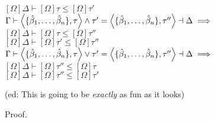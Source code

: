 \documentclass{article}
\begin{document}
\begin{tabbing}
\> $[\Omega]\Delta \vdash [\Omega]\tau \leq [\Omega]\tau'$\\
$\Gamma \vdash \left<\{\hat{\beta}_1,\ldots,\hat{\beta}_n\},\tau\right> \wedge \tau' = \left<\{\hat{\beta}_1,\ldots,\hat{\beta}_n\},\tau''\right> \dashv \Delta \implies$\\
\> $[\Omega]\Delta \vdash [\Omega]\tau \leq [\Omega]\tau''$\\
\> $[\Omega]\Delta \vdash [\Omega]\tau' \leq [\Omega]\tau''$\\
$\Gamma \vdash \left<\{\hat{\beta}_1,\ldots,\hat{\beta}_n\},\tau\right> \vee \tau' = \left<\{\hat{\beta}_1,\ldots,\hat{\beta}_n\},\tau''\right> \dashv \Delta \implies$\\
\> $[\Omega]\Delta \vdash [\Omega]\tau'' \leq [\Omega]\tau$\\
\> $[\Omega]\Delta \vdash [\Omega]\tau'' \leq [\Omega]\tau'$\\
\end{tabbing}

(ed: This is going to be \emph{exactly} as fun as it looks)

Proof.
\end{document}
